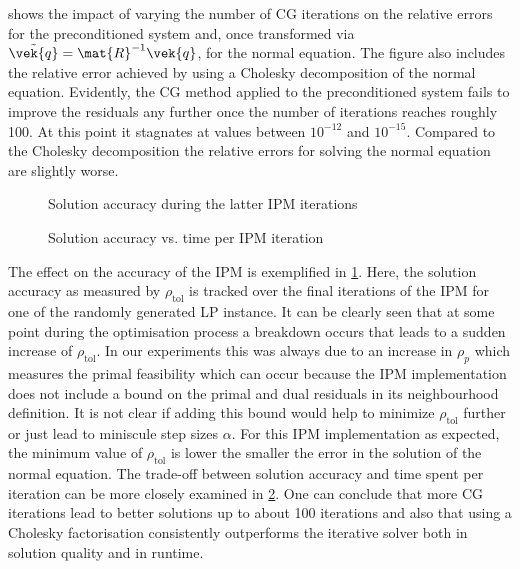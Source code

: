  shows the impact of varying the number of CG iterations on the relative errors for the preconditioned system and, once transformed via \(\tilde{\vek{q}} = \mat{R}^{-1}\vek{q}\), for the normal equation.
The figure also includes the relative error achieved by using a Cholesky decomposition of the normal equation.
Evidently, the CG method applied to the preconditioned system fails to improve the residuals any further once the number of iterations reaches roughly 100.
At this point it stagnates at values between \(10^{-12}\) and \(10^{-15}\).
Compared to the Cholesky decomposition the relative errors for solving the normal equation are slightly worse.

\begin{figure}[tbp]
  \centering%
  \caption{Solution accuracy during the latter IPM iterations}%
  \label{fig:accuracy_history}
\end{figure}

\begin{figure}[tbp]
  \centering%
  \caption{Solution accuracy vs. time per IPM iteration}%
  \label{fig:accuracy_vs_time}
\end{figure}

The effect on the accuracy of the IPM is exemplified in \cref{fig:accuracy_history}.
Here, the solution accuracy as measured by \(\rho_{\mathrm{tol}}\) is tracked over the final iterations of the IPM for one of the randomly generated LP instance.
It can be clearly seen that at some point during the optimisation process a breakdown occurs that leads to a sudden increase of \(\rho_{\mathrm{tol}}\).
In our experiments this was always due to an increase in \(\rho_p\) which measures the primal feasibility which can occur because the IPM implementation does not include a bound on the primal and dual residuals in its neighbourhood definition. 
It is not clear if adding this bound would help to minimize \(\rho_{\mathrm{tol}}\) further or just lead to miniscule step sizes \(\alpha\).
For this IPM implementation as expected, the minimum value of \(\rho_{\mathrm{tol}}\) is lower the smaller the error in the solution of the normal equation.
The trade-off between solution accuracy and time spent per iteration can be more closely examined in \cref{fig:accuracy_vs_time}.
One can conclude that more CG iterations lead to better solutions up to about 100 iterations and also that using a Cholesky factorisation consistently outperforms the iterative solver both in solution quality and in runtime.


